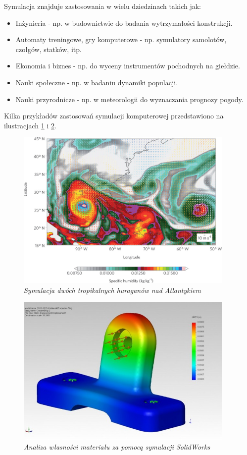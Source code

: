 \documentclass[12pt, twoside, openany]{report}
\theoremstyle{definition}
\begin{document}
Symulacja znajduje zastosowania w wielu dziedzinach takich jak:
\begin{itemize}
\item Inżynieria - np. w budownictwie do badania wytrzymałości konstrukcji.
\item Automaty treningowe, gry komputerowe - np. symulatory samolotów, czołgów, statków, itp.
\item Ekonomia i biznes - np. do wyceny instrumentów pochodnych na giełdzie. 
\item Nauki społeczne - np. w badaniu dynamiki populacji.
\item Nauki przyrodnicze - np. w meteorologii do wyznaczania prognozy pogody.
\end{itemize}

\newpage
Kilka przykładów zastosowań symulacji komputerowej przedstawiono na ilustracjach \ref{MeteorologySimulationImage} i \ref{EngineeringSimulationImage}.

\begin{figure}[H]
	\centering
		\includegraphics[width = 300pt]{MeteorologySimulation} 
		\caption{\textit{Symulacja dwóch tropikalnych huraganów nad Atlantykiem \cite{MeteorologySimulation}}}
\label{MeteorologySimulationImage}
\end{figure}

\begin{figure}[H]
	\centering
		\includegraphics[width = 300pt]{EngineeringSimulation} 
		\caption{\textit{Analiza własności materiału za pomocą symulacji SolidWorks \cite{EngineeringSimulation}}}
\label{EngineeringSimulationImage}
\end{figure}
\end{document}
